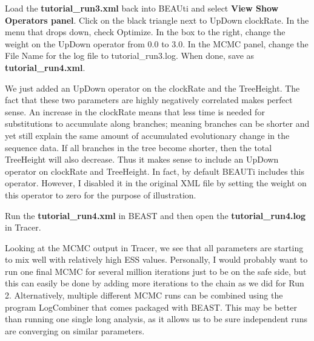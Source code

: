 \documentclass[11pt]{article}
\begin{document}
\begin{framed}
Load the \textbf{tutorial\_run3.xml} back into BEAUti and select \textbf{View \textrightarrow Show Operators panel}. Click on the black triangle next to UpDown clockRate. In the menu that drops down, check Optimize. In the box to the right, change the weight on the UpDown operator from 0.0 to 3.0. In the MCMC panel, change the File Name for the log file to tutorial\_run3.log. When done, save as \textbf{tutorial\_run4.xml}.
\end{framed}

We just added an UpDown operator on the clockRate and the TreeHeight. The fact that these two parameters are highly negatively correlated makes perfect sense. An increase in the clockRate means that less time is needed for substitutions to accumulate along branches; meaning branches can be shorter and yet still explain the same amount of accumulated evolutionary change in the sequence data. If all branches in the tree become shorter, then the total TreeHeight will also decrease. Thus it makes sense to include an UpDown operator on clockRate and TreeHeight. In fact, by default BEAUTi includes this operator. However, I disabled it in the original XML file by setting the weight on this operator to zero for the purpose of illustration.

\begin{framed}
Run the \textbf{tutorial\_run4.xml} in BEAST and then open the \textbf{tutorial\_run4.log} in Tracer.
\end{framed}

Looking at the MCMC output in Tracer, we see that all parameters are starting to mix well with relatively high ESS values. Personally, I would probably want to run one final MCMC for several million iterations just to be on the safe side, but this can easily be done by adding more iterations to the chain as we did for Run 2.  Alternatively, multiple different MCMC runs can be combined using the program LogCombiner that comes packaged with BEAST. This may be better than running one single long analysis, as it allows us to be sure independent runs are converging on similar parameters.  
\end{document}
